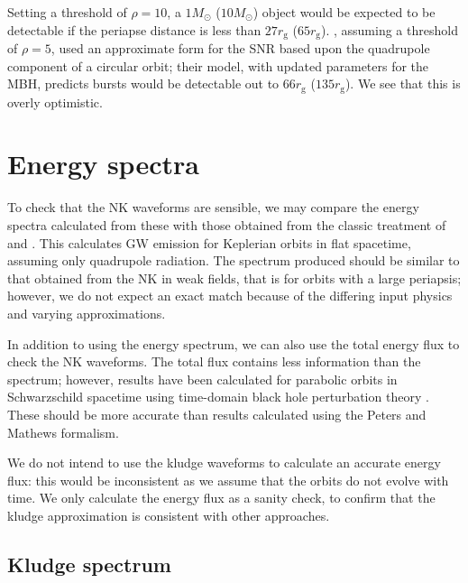 \documentclass[useAMS,usedcolumn,usegraphicx,usenatbib]{mn2e}
\newcommand{\sub}[1]{\ensuremath{_\mathrm{#1}}}
\begin{document}
Setting a threshold of $\rho = 10$, a $1 M_\odot$ ($10 M_\odot$) object would be expected to be detectable if the periapse distance is less than $27 r\sub{g}$ ($65 r\sub{g}$). \citet{Hopman2007}, assuming a threshold of $\rho = 5$, used an approximate form for the SNR based upon the quadrupole component of a circular orbit; their model, with updated parameters for the MBH, predicts bursts would be detectable out to $66 r\sub{g}$ ($135 r\sub{g}$). We see that this is overly optimistic.

\section{Energy spectra}\label{sec:Energy}

To check that the NK waveforms are sensible, we may compare the energy spectra calculated from these with those obtained from the classic treatment of \citet{Peters1963} and \citet{Peters1964}. This calculates GW emission for Keplerian orbits in flat spacetime, assuming only quadrupole radiation. The spectrum produced should be similar to that obtained from the NK in weak fields, that is for orbits with a large periapsis; however, we do not expect an exact match because of the differing input physics and varying approximations.

In addition to using the energy spectrum, we can also use the total energy flux to check the NK waveforms. The total flux contains less information than the spectrum; however, results have been calculated for parabolic orbits in Schwarzschild spacetime using time-domain black hole perturbation theory \citep{Martel2004}. These should be more accurate than results calculated using the Peters and Mathews formalism.

We do not intend to use the kludge waveforms to calculate an accurate energy flux: this would be inconsistent as we assume that the orbits do not evolve with time. We only calculate the energy flux as a sanity check, to confirm that the kludge approximation is consistent with other approaches.

\subsection{Kludge spectrum}
\end{document}
